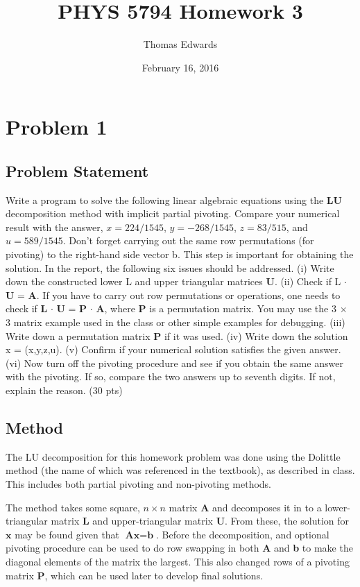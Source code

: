 \documentclass[10pt,letter]{article}
\begin{document}
\begin{titlepage}
\title{PHYS 5794 Homework 3}
\date{February 16, 2016}
\author{Thomas Edwards}
\maketitle
\end{titlepage}

\section{Problem 1}


\subsection{Problem Statement}
 Write a program to solve the following linear algebraic equations using the \textbf{LU} decomposition method
with implicit partial pivoting. Compare your numerical result with the answer, $x = 224/1545$, $y = -268/1545$, $z = 83/515$, and $u = 589/1545$. Don’t forget carrying out the same row permutations
(for pivoting) to the right-hand side vector b. This step is important for obtaining the solution. In
the report, the following six issues should be addressed. (i) Write down the constructed lower L and
upper triangular matrices \textbf{U}. (ii) Check if \textbf{}L $\cdot$ \textbf{U} = \textbf{A}. If you have to carry out row permutations or
operations, one needs to check if \textbf{L} $\cdot$ \textbf{U} = \textbf{P} $\cdot$ \textbf{A}, where \textbf{P} is a permutation matrix. You may use the
3 $\times$ 3 matrix example used in the class or other simple examples for debugging. (iii) Write down a
permutation matrix \textbf{P} if it was used. (iv) Write down the solution x = (x,y,z,u). (v) Confirm if
your numerical solution satisfies the given answer. (vi) Now turn off the pivoting procedure and see
if you obtain the same answer with the pivoting. If so, compare the two answers up to seventh digits. If not, explain the reason. (30 pts)

\subsection{Method}

The LU decomposition for this homework problem was done using the Dolittle method (the name of which was referenced in the textbook), as described in class. This includes both partial pivoting and non-pivoting methods.

The method takes some square, $n \times n$ matrix $\textbf{A}$ and decomposes it in to a lower-triangular matrix $\textbf{L}$ and upper-triangular matrix $\textbf{U}$. From these, the solution for $\textbf{x}$ may be found given that $\textbf{Ax}=\textbf{b}$. Before the decomposition, and optional pivoting procedure can be used to do row swapping in both \textbf{A} and \textbf{b} to make the diagonal elements of the matrix the largest. This also changed rows of a pivoting matrix \textbf{P}, which can be used later to develop final solutions.
\end{document}
